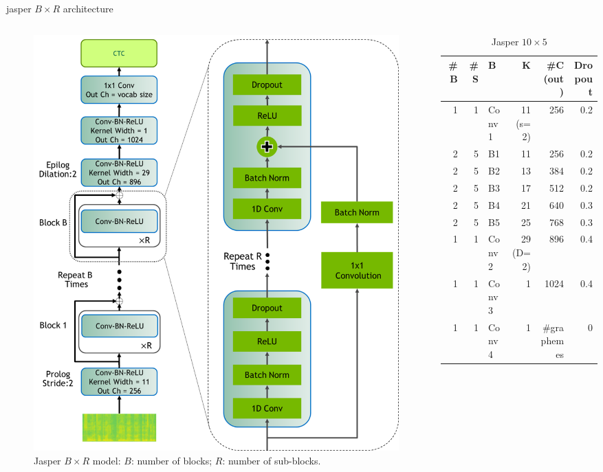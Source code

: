 \documentclass[aspectratio=169,xcolor={dvipsnames,svgnames}]{beamer}
\begin{document}
\begin{frame}[label={sec:jasper-b-times-r-architecture}]{jasper \(B\times R\) architecture}
\begin{columns}
\begin{column}{0.4\columnwidth}
\begin{figure}[htbp]
\centering
\includegraphics[width=.9\linewidth]{org-download-images/Contribution/2024-08-28_07-44-17_screenshot.png}
\caption{Jasper \(B\times R\) model: \(B\): number of blocks; \(R\): number of sub-blocks.}
\end{figure}
\end{column}

\begin{column}{0.6\columnwidth}
\begin{table}[htbp]
\caption{Jasper \(10\times 5\)}
\centering
\begin{tabular}{rrlrrr}
\hline
\#B & \#S & B & K & \#C (out) & Dropout\\[0pt]
\hline
1 & 1 & Conv1 & 11 (s=2) & 256 & 0.2\\[0pt]
\hline
2 & 5 & B1 & 11 & 256 & 0.2\\[0pt]
2 & 5 & B2 & 13 & 384 & 0.2\\[0pt]
2 & 5 & B3 & 17 & 512 & 0.2\\[0pt]
2 & 5 & B4 & 21 & 640 & 0.3\\[0pt]
2 & 5 & B5 & 25 & 768 & 0.3\\[0pt]
\hline
1 & 1 & Conv2 & 29 (D=2) & 896 & 0.4\\[0pt]
1 & 1 & Conv3 & 1 & 1024 & 0.4\\[0pt]
1 & 1 & Conv4 & 1 & \#graphemes & 0\\[0pt]
\hline
\end{tabular}
\end{table}
\end{column}
\end{columns}
\end{frame}
\end{document}
